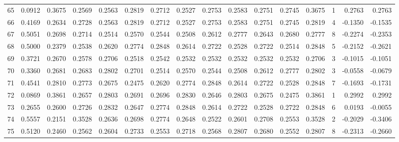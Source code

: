 \begin{tabular}{lrrrrrrrrrrrrrrr}
65  &      0.0912 &  0.3675 &  0.2569 &  0.2563 &  0.2819 &  0.2712 &  0.2527 &  0.2753 &  0.2583 &  0.2751 &   0.2745 &     0.3675 &      1 &                    0.2763 &                     0.2763 \\
66  &      0.4169 &  0.2634 &  0.2728 &  0.2563 &  0.2819 &  0.2712 &  0.2527 &  0.2753 &  0.2583 &  0.2751 &   0.2745 &     0.2819 &      4 &                   -0.1350 &                    -0.1535 \\
67  &      0.5051 &  0.2698 &  0.2714 &  0.2514 &  0.2570 &  0.2544 &  0.2508 &  0.2612 &  0.2777 &  0.2643 &   0.2680 &     0.2777 &      8 &                   -0.2274 &                    -0.2353 \\
68  &      0.5000 &  0.2379 &  0.2538 &  0.2620 &  0.2774 &  0.2848 &  0.2614 &  0.2722 &  0.2528 &  0.2722 &   0.2514 &     0.2848 &      5 &                   -0.2152 &                    -0.2621 \\
69  &      0.3721 &  0.2670 &  0.2578 &  0.2706 &  0.2518 &  0.2542 &  0.2532 &  0.2532 &  0.2532 &  0.2532 &   0.2532 &     0.2706 &      3 &                   -0.1015 &                    -0.1051 \\
70  &      0.3360 &  0.2681 &  0.2683 &  0.2802 &  0.2701 &  0.2514 &  0.2570 &  0.2544 &  0.2508 &  0.2612 &   0.2777 &     0.2802 &      3 &                   -0.0558 &                    -0.0679 \\
71  &      0.4541 &  0.2810 &  0.2773 &  0.2675 &  0.2475 &  0.2620 &  0.2774 &  0.2848 &  0.2614 &  0.2722 &   0.2528 &     0.2848 &      7 &                   -0.1693 &                    -0.1731 \\
72  &      0.0869 &  0.3861 &  0.2657 &  0.2803 &  0.2691 &  0.2696 &  0.2830 &  0.2646 &  0.2803 &  0.2675 &   0.2475 &     0.3861 &      1 &                    0.2992 &                     0.2992 \\
73  &      0.2655 &  0.2600 &  0.2726 &  0.2832 &  0.2647 &  0.2774 &  0.2848 &  0.2614 &  0.2722 &  0.2528 &   0.2722 &     0.2848 &      6 &                    0.0193 &                    -0.0055 \\
74  &      0.5557 &  0.2151 &  0.3528 &  0.2636 &  0.2698 &  0.2774 &  0.2648 &  0.2522 &  0.2601 &  0.2708 &   0.2553 &     0.3528 &      2 &                   -0.2029 &                    -0.3406 \\
75  &      0.5120 &  0.2460 &  0.2562 &  0.2604 &  0.2733 &  0.2553 &  0.2718 &  0.2568 &  0.2807 &  0.2680 &   0.2552 &     0.2807 &      8 &                   -0.2313 &                    -0.2660 \\

\end{tabular}
